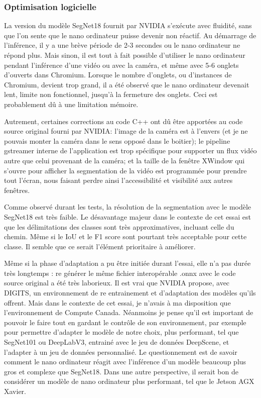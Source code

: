 \subsubsection{Optimisation logicielle}
\par La version du modèle SegNet18 fournit par NVIDIA s'exécute avec fluidité, sans que l'on sente que le nano ordinateur puisse devenir non réactif. Au démarrage de l'inférence, il y a une brève période de 2-3 secondes ou le nano ordinateur ne répond plus. Mais sinon, il est tout à fait possible d'utiliser le nano ordinateur pendant l'inférence d'une vidéo ou avec la caméra, et même avec 5-6 onglets d'ouverts dans Chromium. Lorsque le nombre d'onglets, ou d'instances de Chromium, devient trop grand, il a été observé que le nano ordinateur devenait lent, limite non fonctionnel, jusqu'à la fermeture des onglets. Ceci est probablement dû à une limitation mémoire.
\par Autrement, certaines corrections au code C++ ont dû être apportées au code source original fourni par NVIDIA: l'image de la caméra est à l'envers (et je ne pouvais monter la caméra dans le sens opposé dans le boitier); le pipeline gstreamer interne de l'application est trop spécifique pour supporter un flux vidéo autre que celui provenant de la caméra; et la taille de la fenêtre XWindow qui s'ouvre pour afficher la segmentation de la vidéo est programmée pour prendre tout l'écran, nous faisant perdre ainsi l'accessibilité et visibilité aux autres fenêtres.
\par Comme observé durant les tests, la résolution de la segmentation avec le modèle SegNet18 est très faible. Le désavantage majeur dans le contexte de cet essai est que les délimitations des classes sont très approximatives, incluant celle du chemin. Même si le IoU et le F1 score sont pourtant très acceptable pour cette classe. Il semble que ce serait l'élément prioritaire à améliorer. 
\par Même si la phase d'adaptation a pu être initiée durant l'essai, elle n'a pas durée très longtemps : re générer le même fichier interopérable .onnx avec le code source original a été très laborieux. Il est vrai que NVIDIA propose, avec DIGITS, un environnement de re entrainement et d'adaptation des modèles qu'ils offrent. Mais dans le contexte de cet essai, je n'avais à ma disposition que l'environnement de Compute Canada. Néanmoins je pense qu'il est important de pouvoir le faire tout en gardant le contrôle de son environnement, par exemple pour permettre d'adapter le modèle de notre choix, plus performant, tel que SegNet101 ou DeepLabV3, entrainé avec le jeu de données DeepScene, et l'adapter à un jeu de données personnalisé. Le questionnement est de savoir comment le nano ordinateur réagit avec l'inférence d'un modèle beaucoup plus gros et complexe que SegNet18. Dans une autre perspective, il serait bon de considérer un modèle de nano ordinateur plus performant, tel que le Jetson AGX Xavier.
